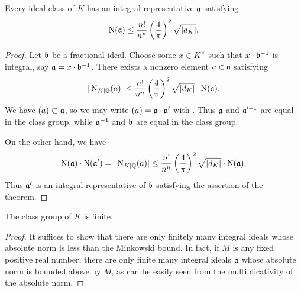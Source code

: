 \begin{theorem}
  Every ideal class of $K$ has an integral representative $\mathfrak{a}$ satisfying
  \[ \operatorname{N}(\mathfrak{a}) \leq \frac{n!}{n^{n}}\left(\frac{4}{\pi}\right)^{2} \sqrt{|d_{K}|}. \]
\end{theorem}
\begin{proof}
  Let $\mathfrak{b}$ be a fractional ideal.
  Choose some $x \in K^{\times}$ such that $x \cdot \mathfrak{b}^{-1}$ is integral, say $\mathfrak{a} = x \cdot \mathfrak{b}^{-1}$.
  There exists a nonzero element $a \in \mathfrak{a}$ satisfying
  \[ |\operatorname{N}_{K|\mathbb{Q}}(a)| \leq \frac{n!}{n^{n}}\left(\frac{4}{\pi}\right)^{2} \sqrt{|d_{K}|} \cdot \operatorname{N}(\mathfrak{a}). \]
  We have $(a) \subset \mathfrak{a}$, so we may write $(a) = \mathfrak{a} \cdot \mathfrak{a}'$ with .
  Thus $\mathfrak{a}$ and $\mathfrak{a}'^{-1}$ are equal in the class group, while $\mathfrak{a}^{-1}$ and $\mathfrak{b}$ are equal in the class group.

  On the other hand, we have
  \[ \operatorname{N}(\mathfrak{a}) \cdot \operatorname{N}(\mathfrak{a}') = |\operatorname{N}_{K|\mathbb{Q}}(a)| \leq \frac{n!}{n^{n}}\left(\frac{4}{\pi}\right)^{2} \sqrt{|d_{K}|} \cdot \operatorname{N}(\mathfrak{a}). \]
  Thus $\mathfrak{a}'$ is an integral representative of $\mathfrak{b}$ satisfying the assertion of the theorem.
\end{proof}

\begin{corollary}
  The class group of $K$ is finite.
\end{corollary}
\begin{proof}
  It suffices to show that there are only finitely many integral ideals whose absolute norm is less than the Minkowski bound.
  In fact, if $M$ is any fixed positive real number, there are only finite many integral ideals $\mathfrak{a}$ whose absolute norm is bounded above by $M$, as can be easily seen from the multiplicativity of the absolute norm.
\end{proof}

